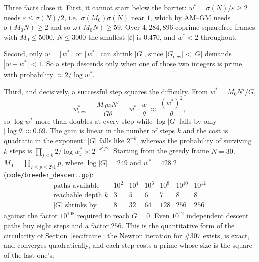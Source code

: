 \documentclass[11pt]{article}
\theoremstyle{definition}
\begin{document}
Three facts close it. First, it cannot start below the barrier: $w^{*}=\sigma(N)/\varepsilon\ge2$
needs $\varepsilon\le\sigma(N)/2$, i.e.\ $\sigma(M_0)\sigma(N)$ near $1$, which by AM--GM needs
$\sigma(M_0N)\ge2$ and so $\omega(M_0N)\ge59$. Over $4{,}284{,}896$ coprime squarefree frames with
$M_0\le5000$, $N\le3000$ the smallest $|\varepsilon|$ is $0.470$, and $w^{*}<2$ throughout.

Second, only $w=\lfloor w^{*}\rfloor$ or $\lceil w^{*}\rceil$ can shrink $|G|$, since
$|G_{\mathrm{new}}|<|G|$ demands $|w-w^{*}|<1$. So a step descends only when one of those two
integers is prime, with probability $\approx2/\log w^{*}$.

Third, and decisively, a successful step squares the difficulty. From $w^{*}=M_0N'/G$,
\[ w^{*}_{\mathrm{new}}=\frac{M_0wN'}{G\theta}=w^{*}\cdot\frac{w}{\theta}\ \approx\
   \frac{(w^{*})^{2}}{\theta}, \]
so $\log w^{*}$ more than doubles at every step while $\log|G|$ falls by only $|\log\theta|\approx
0.69$. The gain is linear in the number of steps $k$ and the cost is quadratic in the exponent:
$|G|$ falls like $2^{-k}$, whereas the probability of surviving $k$ steps is
$\prod_{j<k}2/\log w^{*}_j\asymp2^{-k^{2}/2}$. Starting from the greedy frame $N=30$,
$M_0=\prod_{7\le p\le271}p$, where $\log|G|=249$ and $w^{*}=428.2$
(\texttt{code/breeder\_descent.gp}):
\[
\begin{array}{l|cccccc}
\text{paths available} & 10^{2} & 10^{4} & 10^{6} & 10^{8} & 10^{10} & 10^{12}\\\hline
\text{reachable depth }k & 3 & 5 & 6 & 7 & 8 & 8\\
|G|\text{ shrinks by} & 8 & 32 & 64 & 128 & 256 & 256
\end{array}
\]
against the factor $10^{108}$ required to reach $G=0$. Even $10^{12}$ independent descent paths buy
eight steps and a factor $256$. This is the quantitative form of the circularity of
Section~\ref{sec:frame}: the Newton iteration for \#307 exists, is exact, and converges quadratically,
and each step costs a prime whose size is the square of the last one's.
\end{document}

